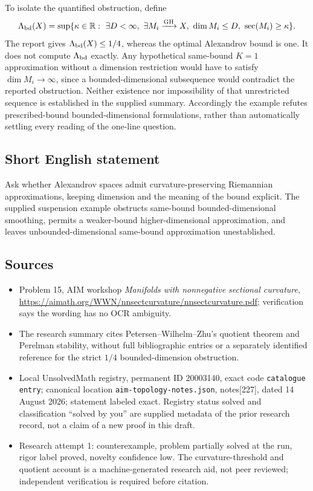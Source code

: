 \documentclass[11pt]{article}
\newcommand{\R}{\mathbb{R}}
\begin{document}
To isolate the quantified obstruction, define
\[
\Lambda_{\rm bd}(X)=\sup\{\kappa\in\R:\ \exists D<\infty,\ \exists M_i\xrightarrow{\rm GH}X,
\ \dim M_i\le D,\ \sec(M_i)\ge\kappa\}.
\]
The report gives \(\Lambda_{\rm bd}(X)\le1/4\), whereas the optimal Alexandrov bound is one. It does not compute \(\Lambda_{\rm bd}\) exactly. Any hypothetical same-bound \(K=1\) approximation without a dimension restriction would have to satisfy \(\dim M_i\to\infty\), since a bounded-dimensional subsequence would contradict the reported obstruction. Neither existence nor impossibility of that unrestricted sequence is established in the supplied summary. Accordingly the example refutes prescribed-bound bounded-dimensional formulations, rather than automatically settling every reading of the one-line question.
\subsection{Short English statement}
Ask whether Alexandrov spaces admit curvature-preserving Riemannian approximations, keeping dimension and the meaning of the bound explicit. The supplied suspension example obstructs same-bound bounded-dimensional smoothing, permits a weaker-bound higher-dimensional approximation, and leaves unbounded-dimensional same-bound approximation unestablished.
\subsection{Sources}
\begin{itemize}
\item Problem 15, AIM workshop \emph{Manifolds with nonnegative sectional curvature}, \url{https://aimath.org/WWN/nnsectcurvature/nnsectcurvature.pdf}; verification says the wording has no OCR ambiguity.
\item The research summary cites Petersen--Wilhelm--Zhu's quotient theorem and Perelman stability, without full bibliographic entries or a separately identified reference for the strict \(1/4\) bounded-dimension obstruction.
\item Local UnsolvedMath registry, permanent ID 20003140, exact code \texttt{catalogue entry}; canonical location \texttt{aim-topology-notes.json}, notes[227], dated 14 August 2026; statement labeled exact. Registry status solved and classification ``solved by you'' are supplied metadata of the prior research record, not a claim of a new proof in this draft.
\item Research attempt 1: counterexample, problem partially solved at the run, rigor label proved, novelty confidence low. The curvature-threshold and quotient account is a machine-generated research aid, not peer reviewed; independent verification is required before citation.
\end{itemize}
\end{document}
